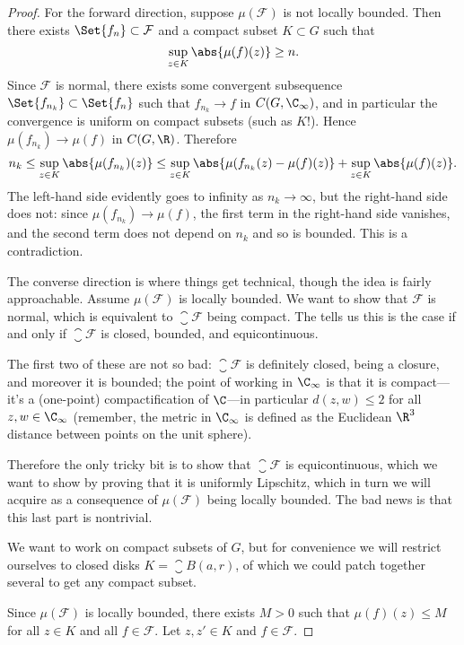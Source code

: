 \begin{proof}
	For the forward direction, suppose $\mu(\mathcal{F})$ is not locally bounded.
	Then there exists $\Set{f_n} \subset \mathcal{F}$ and a compact subset $K \subset G$ such that
	\[
		\sup_{z \in K} \abs{\mu(f)(z)} \geq n.
	\]
	Since $\mathcal{F}$ is normal, there exists some convergent subsequence $\Set{f_{n_k}} \subset \Set{f_n}$ such that $f_{n_k} \to f$ in $C(G, \C_\infty)$, and in particular the convergence is uniform on compact subsets (such as $K$!).
	Hence $\mu(f_{n_k}) \to \mu(f)$ in $C(G, \R)$.
	Therefore
	\[
		n_k \leq \sup_{z \in K} \abs{\mu(f_{n_k})(z)} \leq \sup_{z \in K} \abs{\mu(f_{n_k}(z) - \mu(f)(z)} + \sup_{z \in K} \abs{\mu(f)(z)}.
	\]
	The left-hand side evidently goes to infinity as $n_k \to \infty$, but the right-hand side does not: since $\mu(f_{n_k}) \to \mu(f)$, the first term in the right-hand side vanishes, and the second term does not depend on $n_k$ and so is bounded.
	This is a contradiction.

	The converse direction is where things get technical, though the idea is fairly approachable.
	Assume $\mu(\mathcal{F})$ is locally bounded.
	We want to show that $\mathcal{F}$ is normal, which is equivalent to $\closure{\mathcal{F}}$ being compact.
	The  tells us this is the case if and only if $\closure{\mathcal{F}}$ is closed, bounded, and equicontinuous.

	The first two of these are not so bad: $\closure{\mathcal{F}}$ is definitely closed, being a closure, and moreover it is bounded; the point of working in $\C_\infty$ is that it is compact---it's a (one-point) compactification of $\C$---in particular $d(z, w) \leq 2$ for all $z, w \in \C_\infty$ (remember, the metric in $\C_\infty$ is defined as the Euclidean $\R^3$ distance between points on the unit sphere).

	Therefore the only tricky bit is to show that $\closure{\mathcal{F}}$ is equicontinuous, which we want to show by proving that it is uniformly Lipschitz, which in turn we will acquire as a consequence of $\mu(\mathcal{F})$ being locally bounded.
	The bad news is that this last part is nontrivial.

	We want to work on compact subsets of $G$, but for convenience we will restrict ourselves to closed disks $K = \closure{B(a, r)}$, of which we could patch together several to get any compact subset.

	Since $\mu(\mathcal{F})$ is locally bounded, there exists $M > 0$ such that $\mu(f)(z) \leq M$ for all $z \in K$ and all $f \in \mathcal{F}$.
	Let $z, z' \in K$ and $f \in \mathcal{F}$.


\end{proof}
